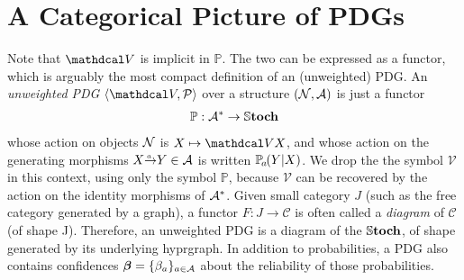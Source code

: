 \section{A Categorical Picture of PDGs}
Note that $\V$ is implicit in $\mathbb P$. 
The two can be expressed as a functor, which is arguably the most
compact definition of an (unweighted) PDG.  
%
    An \emph{unweighted PDG} $\langle\V, \mathcal P\rangle$ 
    over a structure $(\mathcal N, \mathcal A)$ is just a functor
    \begin{align*}
        {\mathbb P}  : 
            \mathcal A^* \to  \mathbb{S}\mathbf{toch}
    \end{align*} 
    whose action on objects $\mathcal N$ is $X \mapsto \V X$, and whose action on the generating morphisms $\ed aXY \in \Ar$
    is written
    $\p_a(Y|X)$. 
We drop the the symbol $\mathcal V$ in this context, using only the symbol $\mathbb P$, because $\mathcal V$ can be recovered by the action on the identity morphisms of $\mathcal A^*$. 
% 
Given small category $J$ 
(such as the free category generated by a graph),
a functor $F : J \to \mathcal C$
is often called a \emph{diagram} of $\mathcal C$ (of shape J).
Therefore, an unweighted PDG is a diagram of the $\mathbb{S}\mathbf{toch}$, of shape
generated by its underlying hyprgraph.
In addition to probabilities, a PDG also contains 
confidences $\boldsymbol\beta = \{ \beta_a \}_{a \in \mathcal A}$ about the reliability of those probabilities. 

